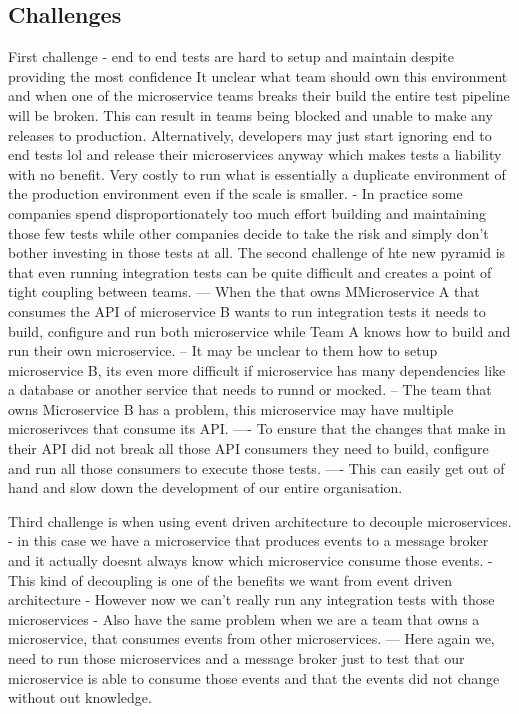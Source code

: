 \documentclass[a4paper, 11pt]{book}
\begin{document}
    \subsection{Challenges}
    First challenge - end to end tests are hard to setup and maintain despite providing the most confidence
    It unclear what team should own this environment and when one of the microservice teams breaks their build the entire test pipeline will be broken.
    This can result in teams being blocked and unable to make any releases to production.
    Alternatively, developers may just start ignoring end to end tests lol and release their microservices anyway which makes tests a liability with no benefit.
    Very costly to run what is essentially a duplicate environment of the production environment even if the scale is smaller.
    - In practice some companies spend disproportionately too much effort building and maintaining those few tests while other companies decide to take the risk and simply don't bother investing in those tests at all.
    The second challenge of hte new pyramid is that even running integration tests can be quite difficult and creates a point of tight coupling between teams.
    --- When the that owns MMicroservice A that consumes the API of microservice B wants to run integration tests it needs to build, configure and run both microservice while Team A knows how to build and run their own microservice.
    -- It may be unclear to them how to setup microservice B, its even more difficult if microservice has many dependencies like a database or another service that needs to runnd or mocked.
    -- The team that owns Microservice B has a problem, this microservice may have multiple microserivces that consume its API.
    ---- To ensure that the changes that make in their API did not break all those API consumers they need to build, configure and run all those consumers to execute those tests.
    ---- This can easily get out of hand and slow down the development of our entire organisation.

    Third challenge is when using event driven architecture to decouple microservices.
    - in this case we have a microservice that produces events to a message broker and it actually doesnt always know which microservice consume those events.
    - This kind of decoupling is one of the benefits we want from event driven architecture
    - However now we can't really run any integration tests with those microservices
    - Also have the same problem when we are a team that owns a microservice, that consumes events from other microservices.
    --- Here again we, need to run those microservices and a message broker just to test that our microservice is able to consume those events and that the events did not change without out knowledge.
\end{document}
